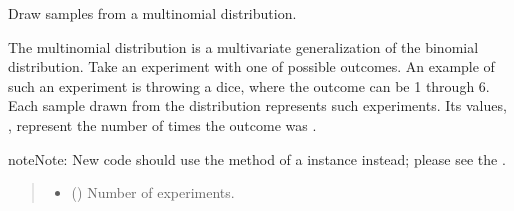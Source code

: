 \documentclass[letterpaper,10pt,english]{sphinxmanual}
\begin{document}

\begin{fulllineitems}
\label{\detokenize{metilda.controllers:metilda.controllers.pitch_art_wizard.move_to_folder}}
\pysigstartsignatures
{}
\pysigstopsignatures
\end{fulllineitems}


\begin{fulllineitems}
\label{\detokenize{metilda.controllers:metilda.controllers.pitch_art_wizard.multinomial}}
\pysigstartsignatures
{}
\pysigstopsignatures
\sphinxAtStartPar
Draw samples from a multinomial distribution.

\sphinxAtStartPar
The multinomial distribution is a multivariate generalization of the
binomial distribution.  Take an experiment with one of 
possible outcomes.  An example of such an experiment is throwing a dice,
where the outcome can be 1 through 6.  Each sample drawn from the
distribution represents  such experiments.  Its values,
, represent the number of times the
outcome was .

\begin{sphinxadmonition}{note}{Note:}
\sphinxAtStartPar
New code should use the 
method of a  instance instead;
please see the .
\end{sphinxadmonition}
\begin{quote}\begin{description}
\begin{itemize}
\item {} 
\sphinxAtStartPar
{} () \textendash{} Number of experiments.


\end{itemize}
\end{description}
\end{quote}
\end{fulllineitems}
\end{document}
